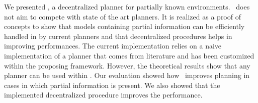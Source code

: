 We presented  \toolName, a  decentralized planner for partially known environments.
\toolName\ does not aim to compete with state of the art planners.
It is realized as a proof of concepts to show that models containing partial information can be efficiently handled in by current planners and that decentralized procedures helps in improving performances.
The current implementation relies on a naive implementation of a planner that comes from literature and has been customized within the proposing framework.
However, the theoretical results show that  any planner can be used within \toolName.
Our evaluation showed how  \toolName\ improves planning in cases in which partial information is present.
We also showed that the implemented decentralized procedure improves the performance.

